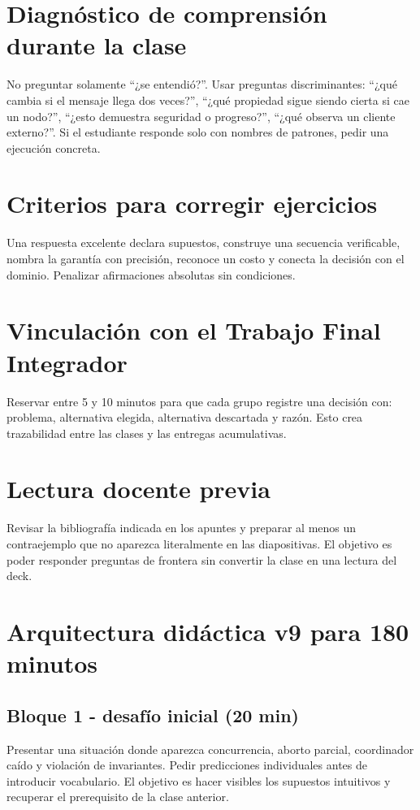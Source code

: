 \documentclass[variant=docente,cover=institutional,mode=screen]{ua-engineering-v6-article}
\begin{document}
\section{Diagnóstico de comprensión durante la clase}
No preguntar solamente ``¿se entendió?''. Usar preguntas discriminantes: ``¿qué cambia si el mensaje llega dos veces?'', ``¿qué propiedad sigue siendo cierta si cae un nodo?'', ``¿esto demuestra seguridad o progreso?'', ``¿qué observa un cliente externo?''. Si el estudiante responde solo con nombres de patrones, pedir una ejecución concreta.
\section{Criterios para corregir ejercicios}
Una respuesta excelente declara supuestos, construye una secuencia verificable, nombra la garantía con precisión, reconoce un costo y conecta la decisión con el dominio. Penalizar afirmaciones absolutas sin condiciones.
\section{Vinculación con el Trabajo Final Integrador}
Reservar entre 5 y 10 minutos para que cada grupo registre una decisión con: problema, alternativa elegida, alternativa descartada y razón. Esto crea trazabilidad entre las clases y las entregas acumulativas.
\section{Lectura docente previa}
Revisar la bibliografía indicada en los apuntes y preparar al menos un contraejemplo que no aparezca literalmente en las diapositivas. El objetivo es poder responder preguntas de frontera sin convertir la clase en una lectura del deck.

\section{Arquitectura didáctica v9 para 180 minutos}
\subsection*{Bloque 1 - desafío inicial (20 min)}
Presentar una situación donde aparezca concurrencia, aborto parcial, coordinador caído y violación de invariantes. Pedir predicciones individuales antes de introducir vocabulario. El objetivo es hacer visibles los supuestos intuitivos y recuperar el prerequisito de la clase anterior.
\end{document}
